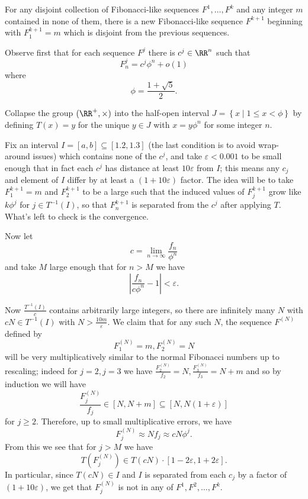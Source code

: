 \begin{lemma*}
  For any disjoint collection of Fibonacci-like sequences
  $F^1,\dots,F^k$ and any integer $m$ contained in none of them,
  there is a new Fibonacci-like sequence $F^{k+1}$ beginning
  with $F^{k+1}_1=m$ which is disjoint from the previous sequences.
\end{lemma*}

Observe first that for each sequence $F^j$ there is $c^j\in \RR^n$ such that
\[ F^j_n=c^j\phi^n+o(1)  \]
where \[\phi=\frac{1+\sqrt{5}}{2}.\]

Collapse the group $(\RR^+,\times)$ into the half-open interval
$J = \left\{ x \mid 1 \le x < \phi \right\}$
by defining $T(x)=y$ for the unique $y\in J$ with $x=y\phi^n$ for some integer $n$.

Fix an interval $I=[a,b]\subseteq [1.2,1.3]$ (the last condition is to
avoid wrap-around issues) which contains none of the $c^j$, and take
$\varepsilon<0.001$ to be small enough that in fact each $c^j$ has
distance at least $10\varepsilon$ from $I$; this means any $c_j$ and
element of $I$ differ by at least a $(1+10\varepsilon)$ factor. The idea
will be to take $F^{k+1}_1=m$ and $F^{k+1}_2$ to be a large such that
the induced values of $F^{k+1}_j$ grow like $k\phi^j$ for $j\in
T^{-1}(I)$, so that $F^{k+1}_n$ is separated from the $c^j$ after
applying $T$. What's left to check is the convergence.

Now let \[c=\lim_{n\to\infty} \frac{f_n}{\phi^n}\] and take
$M$ large enough that for $n>M$ we have
\[\left|\frac{f_n}{c\phi^n}-1\right|<\varepsilon.\]

Now $\frac{T^{-1}(I)}{c}$ contains arbitrarily large integers,
so there are infinitely many $N$ with $cN\in T^{-1}(I)$ with $N>\frac{10m}{\varepsilon}$.
We claim that for any such $N$, the sequence $F^{(N)}$ defined by
\[F^{(N)}_1=m,F^{(N)}_2=N\] will be very multiplicatively similar to the
normal Fibonacci numbers up to rescaling;
indeed for $j=2,j=3$ we have $\frac{F_2^{(N)}}{f_2}=N,\frac{F_3^{(N)}}{f_3}=N+m$
and so by induction we will have
\[ \frac{F^{(N)}_j}{f_j} \in [N,N+m] \subseteq [N,N(1+\varepsilon)] \]
for $j\geq 2$.
Therefore, up to small multiplicative errors, we have
\[F_j^{(N)}\approx Nf_j\approx cN\phi^j.\]
From this we see that for $j>M$ we have
\[T(F_j^{(N)})\in  T(cN)\cdot [1-2\varepsilon,1+2\varepsilon].\]
In particular, since $T(cN)\in I$ and $I$ is separated from each $c_j$
by a factor of $(1+10\varepsilon)$,
we get that $F_j^{(N)}$ is not in any of $F^1,F^2,\dots,F^k$.

